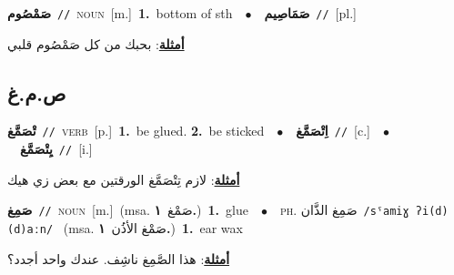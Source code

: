 \documentclass[10pt,a4paper,twoside]{article} %
\begin{document}
\begin{multicols}{2}
{\setlength\topsep{0pt}\textbf{\foreignlanguage{arabic}{صَمْصُوم}}\ {\color{gray}\texttt{//}\color{black}}\ \textsc{noun}\ [m.]\ \textbf{1.}~bottom of sth\ \ $\bullet$\ \ \setlength\topsep{0pt}\textbf{\foreignlanguage{arabic}{صَمَاصِيم}}\ {\color{gray}\texttt{//}\color{black}}\ [pl.]\  \begin{flushright}\color{gray}\foreignlanguage{arabic}{\textbf{\underline{\foreignlanguage{arabic}{أمثلة}}}: بحبك من كل صَمْصُوم قلبي}\end{flushright}\color{black}} \vspace{2mm}

\vspace{-3mm}
\subsection*{\color{blue}\foreignlanguage{arabic}{ص.م.غ}\color{blue}{}} 

{\setlength\topsep{0pt}\textbf{\foreignlanguage{arabic}{تْصَمَّغ}}\ {\color{gray}\texttt{//}\color{black}}\ \textsc{verb}\ [p.]\ \textbf{1.}~be glued.  \textbf{2.}~be sticked\ \ $\bullet$\ \ \setlength\topsep{0pt}\textbf{\foreignlanguage{arabic}{اِتْصَمَّغ}}\ {\color{gray}\texttt{//}\color{black}}\ [c.]\ \ $\bullet$\ \ \setlength\topsep{0pt}\textbf{\foreignlanguage{arabic}{يِتْصَمَّغ}}\ {\color{gray}\texttt{//}\color{black}}\ [i.]\  \begin{flushright}\color{gray}\foreignlanguage{arabic}{\textbf{\underline{\foreignlanguage{arabic}{أمثلة}}}: لازم تِتْصَمَّغ الورقتين مع بعض زي هيك}\end{flushright}\color{black}} \vspace{2mm}

{\setlength\topsep{0pt}\textbf{\foreignlanguage{arabic}{صَمِغ}}\ {\color{gray}\texttt{//}\color{black}}\ \textsc{noun}\ [m.]\ \color{gray}(msa. \foreignlanguage{arabic}{صَمْغ}~\foreignlanguage{arabic}{\textbf{١.}})\color{black}\ \textbf{1.}~glue\ \ $\bullet$\ \ \textsc{ph.} \color{gray} \foreignlanguage{arabic}{صَمِغ الذَّان}\color{black}\ {\color{gray}\texttt{/{\sffamily sˤamiɣ ʔi(d)(d)aːn}/}\color{black}}\ \color{gray} (msa. \foreignlanguage{arabic}{صَمْغ الأذُن}~\foreignlanguage{arabic}{\textbf{١.}})\color{black}\ \textbf{1.}~ear wax\  \begin{flushright}\color{gray}\foreignlanguage{arabic}{\textbf{\underline{\foreignlanguage{arabic}{أمثلة}}}: هذا الصَّمِغ ناشِف. عندك واحد أجدد؟}\end{flushright}\color{black}} \vspace{2mm}


\end{multicols}
\end{document}
